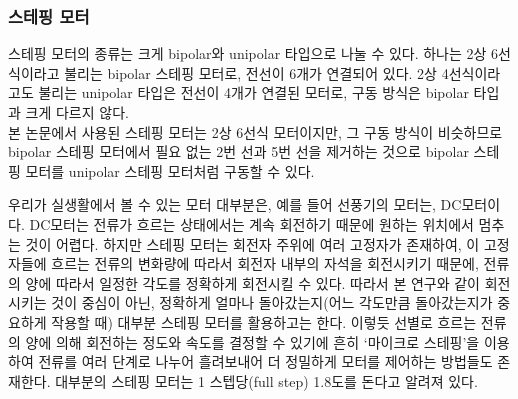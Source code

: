 \subsubsection{스테핑 모터}


스테핑 모터의 종류는 크게 bipolar와 unipolar 타입으로 나눌 수 있다. 하나는 2상 6선식이라고 불리는 bipolar 스테핑 모터로, 전선이 6개가 연결되어 있다. 2상 4선식이라고도 불리는 unipolar 타입은 전선이 4개가 연결된 모터로, 구동 방식은 bipolar 타입과 크게 다르지 않다.\\
본 논문에서 사용된 스테핑 모터는 2상 6선식 모터이지만, 그 구동 방식이 비슷하므로 bipolar 스테핑 모터에서 필요 없는 2번 선과 5번 선을 제거하는 것으로 bipolar 스테핑 모터를 unipolar 스테핑 모터처럼 구동할 수 있다.


우리가 실생활에서 볼 수 있는 모터 대부분은, 예를 들어 선풍기의 모터는, DC모터이다. DC모터는 전류가 흐르는 상태에서는 계속 회전하기 때문에 원하는 위치에서 멈추는 것이 어렵다. 하지만 스테핑 모터는 회전자 주위에 여러 고정자가 존재하여, 이 고정자들에 흐르는 전류의 변화량에 따라서 회전자 내부의 자석을 회전시키기 때문에, 전류의 양에 따라서 일정한 각도를 정확하게 회전시킬 수 있다. 따라서 본 연구와 같이 회전시키는 것이 중심이 아닌, 정확하게 얼마나 돌아갔는지(어느 각도만큼 돌아갔는지가 중요하게 작용할 때) 대부분 스테핑 모터를 활용하고는 한다. 이렇듯 선별로 흐르는 전류의 양에 의해 회전하는 정도와 속도를 결정할 수 있기에 흔히 ‘마이크로 스테핑’을 이용하여 전류를 여러 단계로 나누어 흘려보내어 더 정밀하게 모터를 제어하는 방법들도 존재한다. 대부분의 스테핑 모터는 1 스텝당(full step) 1.8도를 돈다고 알려져 있다.



